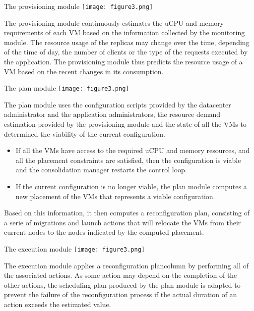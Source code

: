 \begin{frame}{The provisioning module
	\texttt{[image: figure3.png]} }

The provisioning module continuously estimates
the \alert{uCPU} and \alert{memory} requirements of each VM based on the information
collected by the monitoring module. The resource usage of the replicas may
change over the time, depending of the time of day, the number of clients or
the type of the requests executed by the application. The provisioning module
thus predicts the resource usage of a VM based on the recent changes in its
consumption.

\end{frame}
\begin{frame}{The plan module
	\texttt{[image: figure3.png]} }

The plan module uses the configuration scripts provided by
the datacenter administrator and the application administrators, the resource
demand estimation provided by the provisioning module and the state of all
the VMs to \alert{determined the viability} of the current configuration.
\pause{} 
\begin{itemize}
\item If all the
VMs have access to the required uCPU and memory resources, and all the
placement constraints are satisfied, then the configuration is viable and the
consolidation manager restarts the control loop. 
\pause{}
\item If the current configuration is
no longer viable, the plan module computes a new placement of the VMs that
represents a viable configuration. 
\end{itemize}
\pause{}
Based on this information, it then computes a
\alert{reconfiguration plan}, consisting of a serie of \alert{migrations and 
launch actions} that
will relocate the VMs from their current nodes to the nodes indicated by the
computed placement.
\end{frame}
\begin{frame}{The execution module
	\texttt{[image: figure3.png]} }

The execution module applies a reconfiguration plancolumn
by performing all of the associated actions. As some action may depend on
the completion of the other actions, the scheduling plan produced by the plan
module is adapted to prevent the failure of the reconfiguration process if the
actual duration of an action exceeds the estimated value.

\end{frame}

